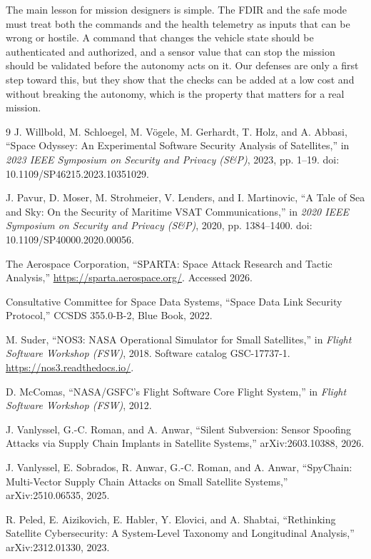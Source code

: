 \documentclass[conference,letterpaper,10pt]{IEEEtran}
\begin{document}
The main lesson for mission designers is simple. The FDIR and the safe mode must treat both the commands and the health telemetry as inputs that can be wrong or hostile. A command that changes the vehicle state should be authenticated and authorized, and a sensor value that can stop the mission should be validated before the autonomy acts on it. Our defenses are only a first step toward this, but they show that the checks can be added at a low cost and without breaking the autonomy, which is the property that matters for a real mission.

\begin{thebibliography}{9}
J. Willbold, M. Schloegel, M. V\"ogele, M. Gerhardt, T. Holz, and A. Abbasi,
``Space Odyssey: An Experimental Software Security Analysis of Satellites,''
in \emph{2023 IEEE Symposium on Security and Privacy (S\&P)}, 2023, pp. 1--19.
doi: 10.1109/SP46215.2023.10351029.

J. Pavur, D. Moser, M. Strohmeier, V. Lenders, and I. Martinovic,
``A Tale of Sea and Sky: On the Security of Maritime VSAT Communications,''
in \emph{2020 IEEE Symposium on Security and Privacy (S\&P)}, 2020, pp. 1384--1400.
doi: 10.1109/SP40000.2020.00056.

The Aerospace Corporation,
``SPARTA: Space Attack Research and Tactic Analysis,''
\url{https://sparta.aerospace.org/}. Accessed 2026.

Consultative Committee for Space Data Systems,
``Space Data Link Security Protocol,''
CCSDS 355.0-B-2, Blue Book, 2022.

M. Suder,
``NOS3: NASA Operational Simulator for Small Satellites,''
in \emph{Flight Software Workshop (FSW)}, 2018. Software catalog GSC-17737-1.
\url{https://nos3.readthedocs.io/}.

D. McComas,
``NASA/GSFC's Flight Software Core Flight System,''
in \emph{Flight Software Workshop (FSW)}, 2012.

J. Vanlyssel, G.-C. Roman, and A. Anwar,
``Silent Subversion: Sensor Spoofing Attacks via Supply Chain Implants in Satellite Systems,''
arXiv:2603.10388, 2026.

J. Vanlyssel, E. Sobrados, R. Anwar, G.-C. Roman, and A. Anwar,
``SpyChain: Multi-Vector Supply Chain Attacks on Small Satellite Systems,''
arXiv:2510.06535, 2025.

R. Peled, E. Aizikovich, E. Habler, Y. Elovici, and A. Shabtai,
``Rethinking Satellite Cybersecurity: A System-Level Taxonomy and Longitudinal Analysis,''
arXiv:2312.01330, 2023.
\end{thebibliography}
\end{document}
